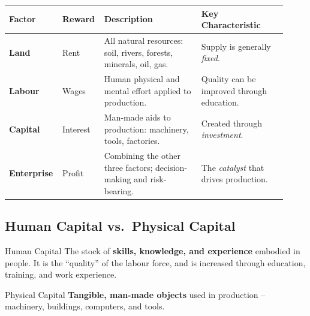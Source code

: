 \documentclass[11pt, a4paper, twoside]{book}
\begin{document}
\begin{tcolorbox}[
  enhanced, colback=LightBlue, colframe=NavyPrimary,
  arc=0pt, boxrule=0.7pt,
  left=8pt, right=8pt, top=6pt, bottom=6pt
]
\begin{tabular}{@{}>{\RaggedRight\arraybackslash}p{0.14\linewidth}>{\RaggedRight\arraybackslash}p{0.14\linewidth}>{\RaggedRight\arraybackslash}p{0.34\linewidth}>{\RaggedRight\arraybackslash}p{0.3\linewidth}@{}}
\textbf{\color{NavyPrimary}Factor} & \textbf{\color{NavyPrimary}Reward} & \textbf{\color{NavyPrimary}Description} & \textbf{\color{NavyPrimary}Key Characteristic} \\
\midrule
\textbf{Land} & Rent & All natural resources: soil, rivers, forests, minerals, oil, gas. & Supply is generally \emph{fixed}. \\
\textbf{Labour} & Wages & Human physical and mental effort applied to production. & Quality can be improved through education. \\
\textbf{Capital} & Interest & Man-made aids to production: machinery, tools, factories. & Created through \emph{investment}. \\
\textbf{Enterprise} & Profit & Combining the other three factors; decision-making and risk-bearing. & The \emph{catalyst} that drives production. \\
\end{tabular}
\end{tcolorbox}

\subsection{Human Capital vs.\ Physical Capital}

\begin{keyterm}{Human Capital}
The stock of \textbf{skills, knowledge, and experience} embodied in people. It is the ``quality'' of the labour force, and is increased through education, training, and work experience.
\end{keyterm}

\begin{keyterm}{Physical Capital}
\textbf{Tangible, man-made objects} used in production -- machinery, buildings, computers, and tools.
\end{keyterm}
\end{document}

